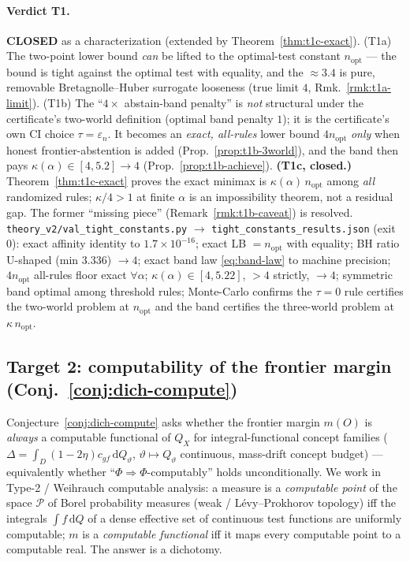 \paragraph{Verdict T1.} \textbf{CLOSED} as a characterization (extended by
Theorem~\ref{thm:t1c-exact}). (T1a) The two-point lower bound
\emph{can} be lifted to the optimal-test constant $n_{\mathrm{opt}}$ --- the bound is tight
against the optimal test with equality, and the $\approx3.4$ is pure, removable
Bretagnolle--Huber surrogate looseness (true limit $4$, Rmk.~\ref{rmk:t1a-limit}). (T1b) The
``$4\times$ abstain-band penalty'' is \emph{not} structural under the certificate's two-world
definition (optimal band penalty $1$); it is the certificate's own CI choice
$\tau=\varepsilon_n$. It becomes an \emph{exact, all-rules} lower bound $4n_{\mathrm{opt}}$
\emph{only} when honest frontier-abstention is added (Prop.~\ref{prop:t1b-3world}), and the band
then pays $\kappa(\alpha)\in[4,5.2]\to4$ (Prop.~\ref{prop:t1b-achieve}). \textbf{(T1c, closed.)}
Theorem~\ref{thm:t1c-exact} proves the exact minimax is $\kappa(\alpha)\,n_{\mathrm{opt}}$ among
\emph{all} randomized rules; $\kappa/4>1$ at finite $\alpha$ is an impossibility theorem, not a
residual gap. The former ``missing piece'' (Remark~\ref{rmk:t1b-caveat}) is resolved. \texttt{theory\_v2/val\_tight\_constants.py}
$\to$ \texttt{tight\_constants\_results.json} (exit $0$): exact affinity identity to
$1.7\times10^{-16}$; exact LB $=n_{\mathrm{opt}}$ with equality; BH ratio U-shaped (min
$3.336$) $\to4$; exact band law \eqref{eq:band-law} to machine precision; $4n_{\mathrm{opt}}$
all-rules floor exact $\forall\alpha$; $\kappa(\alpha)\in[4,5.22]$, $>4$ strictly, $\to4$;
symmetric band optimal among threshold rules; Monte-Carlo confirms the $\tau=0$ rule certifies
the two-world problem at $n_{\mathrm{opt}}$ and the band certifies the three-world problem at
$\kappa\,n_{\mathrm{opt}}$.

\subsection{Target 2: computability of the frontier margin (Conj.~\ref{conj:dich-compute})}
\label{sec:wave3-t2}
Conjecture~\ref{conj:dich-compute} asks whether the frontier margin $m(O)$ is \emph{always} a
computable functional of $Q_X$ for integral-functional concept families ($\Delta=\int_D(1-2\eta)
c_{gf}\,\mathrm dQ_\vartheta$, $\vartheta\mapsto Q_\vartheta$ continuous, mass-drift concept
budget) --- equivalently whether ``$\Phi\Rightarrow\Phi$-computably'' holds unconditionally. We
work in Type-2 / Weihrauch computable analysis: a measure is a \emph{computable point} of the
space $\mathcal P$ of Borel probability measures (weak / L\'evy--Prokhorov topology) iff the
integrals $\int f\,\mathrm dQ$ of a dense effective set of continuous test functions are
uniformly computable; $m$ is a \emph{computable functional} iff it maps every computable point
to a computable real. The answer is a dichotomy.

